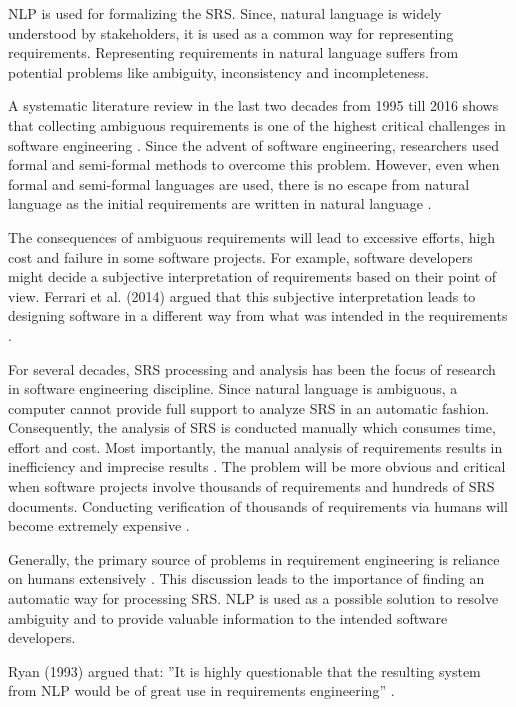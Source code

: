 \begin{multicols*}{2}	
	\gls{NLP} is used for formalizing the \gls{SRS}. Since, natural language is widely understood by stakeholders, it is used as a common way for representing requirements. Representing requirements in natural language suffers from potential problems like ambiguity, inconsistency and incompleteness.
	
	A systematic literature review in the last two decades from 1995 till 2016 shows that collecting ambiguous requirements is one of the highest critical challenges in software engineering \cite{Besrour}. Since the advent of software engineering, researchers used formal and semi-formal methods to overcome this problem. However, even when formal and semi-formal languages are used, there is no escape from natural language as the initial requirements are written in natural language \cite{Kamsties}.
	
	The consequences of ambiguous requirements will lead to excessive efforts, high cost and failure in some software projects. For example, software developers might decide a subjective interpretation of requirements based on their point of view. Ferrari et al. (2014) argued that this subjective interpretation leads to designing software in a different way from what was intended in the requirements \cite{Ferrari}.
	
	For several decades, \gls{SRS} processing and analysis has been the focus of research in software engineering discipline. Since natural language is ambiguous, a computer cannot provide full support to analyze \gls{SRS} in an automatic fashion. Consequently, the analysis of \gls{SRS} is conducted manually which consumes time, effort and cost. Most importantly, the manual analysis of requirements results in inefficiency and imprecise results \cite{Wang}. The problem will be more obvious and critical when software projects involve thousands of requirements and hundreds of \gls{SRS} documents. Conducting verification of thousands of requirements via humans will become extremely expensive \cite{Fanmuy}.
	
	Generally, the primary source of problems in requirement engineering is reliance on humans extensively \cite{Ahmed}. This discussion leads to the importance of finding an automatic way for processing \gls{SRS}. \gls{NLP} is used as a possible solution to resolve ambiguity and to provide valuable information to the intended software developers.
	
	Ryan (1993) argued that: ”It is highly questionable that the resulting system from \gls{NLP} would be of great use in requirements engineering” \cite{Ryan}.
	

\end{multicols*}
